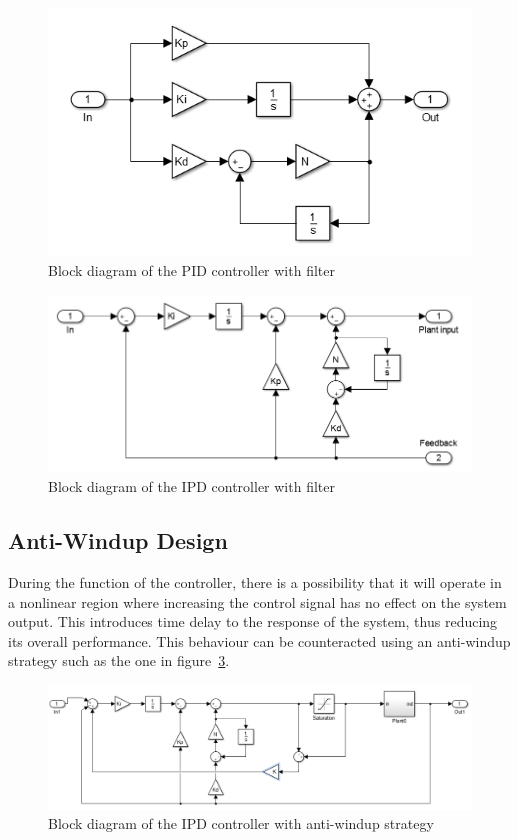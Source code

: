 \begin{figure}[!h]
	\centering
	\includegraphics[width=.7\linewidth]{graphics/pidwfilter}
	\caption{Block diagram of the PID controller with filter}
	\label{fig:pidfilter}
\end{figure}

\begin{figure}[!h]
	\centering
	\includegraphics[width=.9\linewidth]{graphics/ipdwfilter}
	\caption{Block diagram of the IPD controller with filter}
	\label{fig:ipdfilter}
\end{figure}


\subsection{Anti-Windup Design}

During the function of the controller, there is a possibility that it will operate in a nonlinear region where increasing the control signal has no effect on the system output. This introduces time delay to the response of the system, thus reducing its overall performance. This behaviour can be counteracted using an anti-windup strategy such as the one in figure~\ref{fig:ipdantiwindupstrategy}.

\begin{figure}[!h]
	\centering
	\includegraphics[width=.9\linewidth]{graphics/ipdwindupdesign}
	\caption{Block diagram of the IPD controller with anti-windup strategy}
	\label{fig:ipdantiwindupstrategy}
\end{figure}

